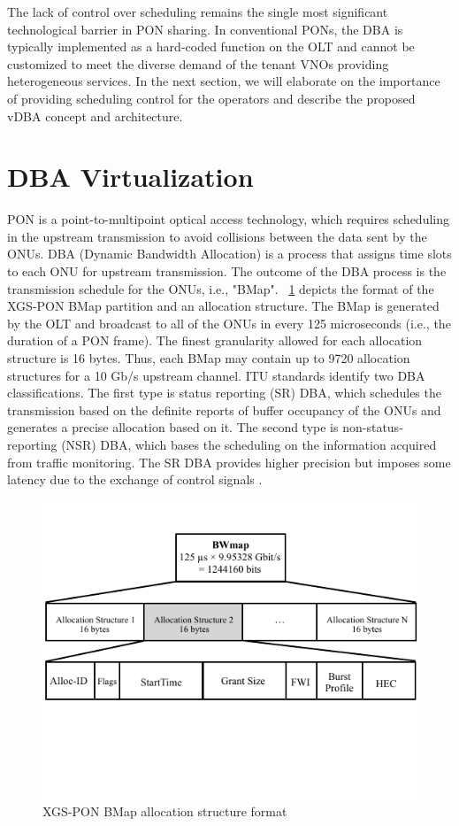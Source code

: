  The lack of control over scheduling remains the single most significant technological barrier in \ac{PON} sharing. In conventional \acp{PON}, the \ac{DBA} is typically implemented as a hard-coded function on the \ac{OLT} and cannot be customized to meet the diverse demand of the tenant \acp{VNO} providing heterogeneous services. 
 In the next section, we will elaborate on the importance of providing scheduling control for the operators and describe the proposed \ac{vDBA} concept and architecture.
 

 
 
\section{DBA Virtualization}
\ac{PON} is a point-to-multipoint optical access technology, which requires scheduling in the upstream transmission to avoid collisions between the data sent by the ONUs. \ac{DBA} (Dynamic Bandwidth Allocation) is a process that assigns time slots to each \ac{ONU} for upstream transmission. The outcome of the \ac{DBA} process is the transmission schedule for the ONUs, i.e., "\ac{BMap}".  \figureautorefname~\ref{BMap} depicts the format of the XGS-\ac{PON} \cite{G.9807.1} \ac{BMap} partition and an allocation structure. The \ac{BMap} is generated by the OLT and broadcast to all of the ONUs in every 125 microseconds (i.e., the duration of a \ac{PON} frame). The finest granularity allowed for each allocation structure is 16 bytes. Thus, each \ac{BMap} may contain up to 9720 allocation structures for a 10 Gb/s upstream channel. ITU standards identify two \ac{DBA} classifications. The first type is status reporting (SR) \ac{DBA}, which schedules the transmission based on the definite reports of buffer occupancy of the ONUs and generates a precise allocation based on it. The second type is non-status-reporting (NSR) \ac{DBA}, which bases the scheduling on the information acquired from traffic monitoring. The SR \ac{DBA} provides higher precision but imposes some latency due to the exchange of control signals \cite{haran2008importance}.
\begin{figure}[htbp]
\centering
 \includegraphics[width=0.8\columnwidth]{Figures/BMap.pdf}
\caption{XGS-\ac{PON} \ac{BMap} allocation structure format}
\label{BMap}
\end{figure}
